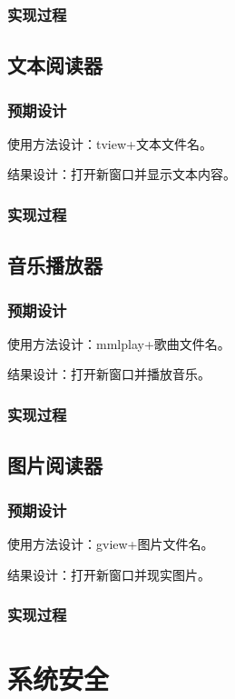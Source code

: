     \subsubsection{实现过程}

\subsection{文本阅读器}

    \subsubsection{预期设计}

    使用方法设计：tview+文本文件名。

    结果设计：打开新窗口并显示文本内容。
    \subsubsection{实现过程}

\subsection{音乐播放器}
    \subsubsection{预期设计}

    使用方法设计：mmlplay+歌曲文件名。

    结果设计：打开新窗口并播放音乐。
    \subsubsection{实现过程}

\subsection{图片阅读器}
    \subsubsection{预期设计}

    使用方法设计：gview+图片文件名。

    结果设计：打开新窗口并现实图片。
    \subsubsection{实现过程}

\section{系统安全}

